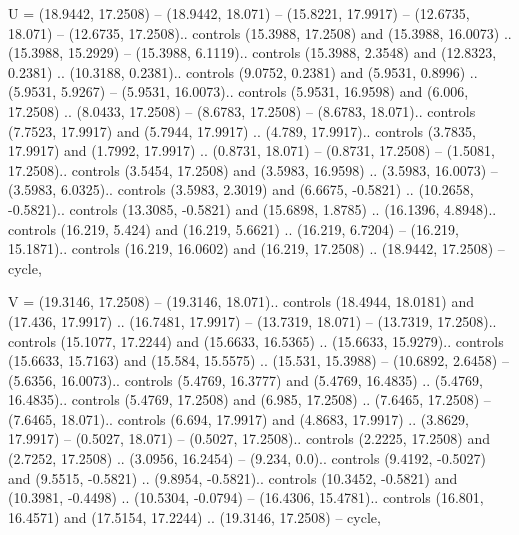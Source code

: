 U = {(18.9442, 17.2508) -- (18.9442, 18.071) -- (15.8221, 17.9917) -- (12.6735, 18.071) -- (12.6735, 17.2508).. controls (15.3988, 17.2508) and (15.3988, 16.0073) .. (15.3988, 15.2929) -- (15.3988, 6.1119).. controls (15.3988, 2.3548) and (12.8323, 0.2381) .. (10.3188, 0.2381).. controls (9.0752, 0.2381) and (5.9531, 0.8996) .. (5.9531, 5.9267) -- (5.9531, 16.0073).. controls (5.9531, 16.9598) and (6.006, 17.2508) .. (8.0433, 17.2508) -- (8.6783, 17.2508) -- (8.6783, 18.071).. controls (7.7523, 17.9917) and (5.7944, 17.9917) .. (4.789, 17.9917).. controls (3.7835, 17.9917) and (1.7992, 17.9917) .. (0.8731, 18.071) -- (0.8731, 17.2508) -- (1.5081, 17.2508).. controls (3.5454, 17.2508) and (3.5983, 16.9598) .. (3.5983, 16.0073) -- (3.5983, 6.0325).. controls (3.5983, 2.3019) and (6.6675, -0.5821) .. (10.2658, -0.5821).. controls (13.3085, -0.5821) and (15.6898, 1.8785) .. (16.1396, 4.8948).. controls (16.219, 5.424) and (16.219, 5.6621) .. (16.219, 6.7204) -- (16.219, 15.1871).. controls (16.219, 16.0602) and (16.219, 17.2508) .. (18.9442, 17.2508) -- cycle},

V = {(19.3146, 17.2508) -- (19.3146, 18.071).. controls (18.4944, 18.0181) and (17.436, 17.9917) .. (16.7481, 17.9917) -- (13.7319, 18.071) -- (13.7319, 17.2508).. controls (15.1077, 17.2244) and (15.6633, 16.5365) .. (15.6633, 15.9279).. controls (15.6633, 15.7163) and (15.584, 15.5575) .. (15.531, 15.3988) -- (10.6892, 2.6458) -- (5.6356, 16.0073).. controls (5.4769, 16.3777) and (5.4769, 16.4835) .. (5.4769, 16.4835).. controls (5.4769, 17.2508) and (6.985, 17.2508) .. (7.6465, 17.2508) -- (7.6465, 18.071).. controls (6.694, 17.9917) and (4.8683, 17.9917) .. (3.8629, 17.9917) -- (0.5027, 18.071) -- (0.5027, 17.2508).. controls (2.2225, 17.2508) and (2.7252, 17.2508) .. (3.0956, 16.2454) -- (9.234, 0.0).. controls (9.4192, -0.5027) and (9.5515, -0.5821) .. (9.8954, -0.5821).. controls (10.3452, -0.5821) and (10.3981, -0.4498) .. (10.5304, -0.0794) -- (16.4306, 15.4781).. controls (16.801, 16.4571) and (17.5154, 17.2244) .. (19.3146, 17.2508) -- cycle},

